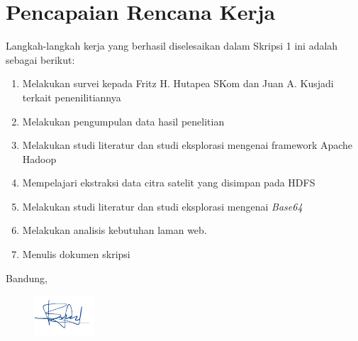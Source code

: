\documentclass[a4paper,twoside]{article}
\begin{document}
\section{Pencapaian Rencana Kerja}
Langkah-langkah kerja yang berhasil diselesaikan dalam Skripsi 1 ini adalah sebagai berikut:
\begin{enumerate}
\item Melakukan survei kepada Fritz H. Hutapea SKom dan Juan A. Kusjadi terkait penenilitiannya
\item Melakukan pengumpulan data hasil penelitian
\item Melakukan studi literatur dan studi eksplorasi mengenai framework Apache Hadoop
\item Mempelajari ekstraksi data citra satelit yang disimpan pada HDFS
\item Melakukan studi literatur dan studi eksplorasi mengenai \textit{Base64}
\item Melakukan analisis kebutuhan laman web.
\item Menulis dokumen skripsi
\end{enumerate}



\vspace{1cm}
\centering Bandung, \tanggal\\
\begin{figure}[h]
	\centering
	\includegraphics[width=0.2\textwidth]{tandatangan.jpg}
\end{figure}
\nama \\ 
\vspace{1cm}
\end{document}

